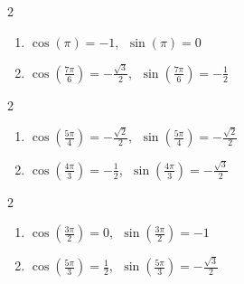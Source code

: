 \documentclass{ximera}
\begin{document}
\begin{multicols}{2}

\begin{enumerate}

\setcounter{enumi}{\value{HW}}

\item $\cos(\pi) = -1$, $\; \sin(\pi) = 0$ 

\item $\cos\left(\frac{7\pi}{6}\right) = -\frac{\sqrt{3}}{2}$, $\; \sin\left(\frac{7\pi}{6}\right) = -\frac{1}{2}$

\setcounter{HW}{\value{enumi}}

\end{enumerate}

\end{multicols}

\begin{multicols}{2}

\begin{enumerate}

\setcounter{enumi}{\value{HW}}

\item $\cos \left(\frac{5\pi}{4} \right) = -\frac{\sqrt{2}}{2}$, $\; \sin \left(\frac{5\pi}{4} \right) = -\frac{\sqrt{2}}{2}$

\item $\cos\left(\frac{4\pi}{3}\right) = -\frac{1}{2}$, $\; \sin \left(\frac{4\pi}{3}\right) = -\frac{\sqrt{3}}{2}$

\setcounter{HW}{\value{enumi}}

\end{enumerate}

\end{multicols}

\begin{multicols}{2}

\begin{enumerate}

\setcounter{enumi}{\value{HW}}

\item $\cos \left(\frac{3\pi}{2}\right) = 0$, $\; \sin \left(\frac{3\pi}{2}\right) = -1$

\item $\cos\left(\frac{5\pi}{3}\right) = \frac{1}{2}$, $\; \sin \left(\frac{5\pi}{3}\right) = -\frac{\sqrt{3}}{2}$

\setcounter{HW}{\value{enumi}}

\end{enumerate}

\end{multicols}
\end{document}

